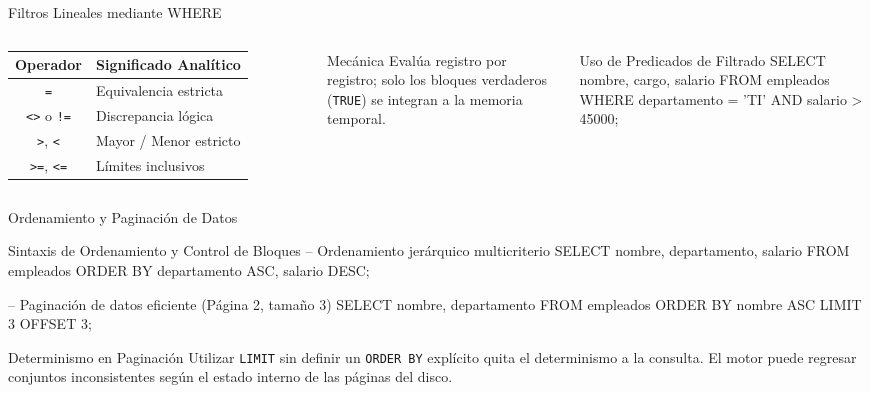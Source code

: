 \documentclass[12pt, aspectratio=169, UTF8]{beamer}
\begin{document}
\begin{frame}[fragile]{Filtros Lineales mediante WHERE}
  \begin{columns}[T]
      \small
      \renewcommand{\arraystretch}{1.2}
      \begin{tabular}{@{} c l @{}}
        \toprule
        \textbf{Operador} & \textbf{Significado Analítico} \\
        \midrule
        \texttt{=}   & Equivalencia estricta \\
        \texttt{<>} o \texttt{!=} & Discrepancia lógica \\
        \texttt{>}, \texttt{<}   & Mayor / Menor estricto \\
        \texttt{>=}, \texttt{<=} & Límites inclusivos \\
        \bottomrule
      \end{tabular}
      \vspace{6pt}
      \begin{exampleblock}{Mecánica}
        Evalúa registro por registro; solo los bloques verdaderos (\texttt{TRUE}) se integran a la memoria temporal.
      \end{exampleblock}
      \begin{sqlbox}{Uso de Predicados de Filtrado}
SELECT nombre, cargo, salario
FROM empleados
WHERE departamento = 'TI'
  AND salario > 45000;
      \end{sqlbox}
  \end{columns}
\end{frame}

\begin{frame}[fragile]{Ordenamiento y Paginación de Datos}
  \begin{sqlbox}{Sintaxis de Ordenamiento y Control de Bloques}
-- Ordenamiento jerárquico multicriterio
SELECT nombre, departamento, salario
FROM empleados
ORDER BY departamento ASC, salario DESC;

-- Paginación de datos eficiente (Página 2, tamaño 3)
SELECT nombre, departamento
FROM empleados
ORDER BY nombre ASC
LIMIT 3 OFFSET 3;
  \end{sqlbox}
  \begin{alertblock}{Determinismo en Paginación}
    Utilizar \texttt{LIMIT} sin definir un \texttt{ORDER BY} explícito quita el determinismo a la consulta. El motor puede regresar conjuntos inconsistentes según el estado interno de las páginas del disco.
  \end{alertblock}
\end{frame}
\end{document}
